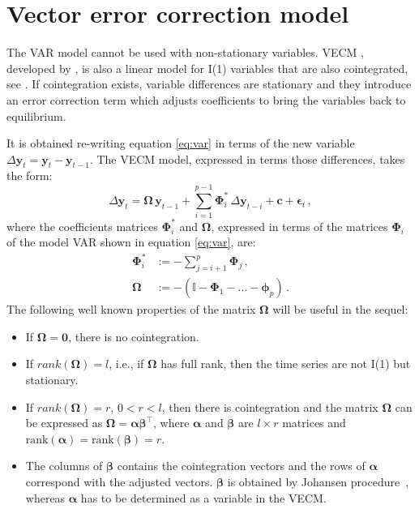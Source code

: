\section{Vector error correction model}\label{sec:vecm}
The VAR model cannot be used with non-stationary variables. VECM ,
developed by \cite{engle87}, is also a linear model for I(1) variables that are
also cointegrated, see \cite{banerjee1993}. If cointegration exists, variable
differences are stationary and they introduce an error correction term which
adjusts coefficients to bring the variables back to equilibrium. 

It is obtained re-writing equation \ref{eq:var} in terms of the new
variable $\Delta\mathbf{y}_t=\mathbf{y}_t-\mathbf{y}_{t-1}$.
The VECM model, expressed in terms those differences, takes the form:
\begin{equation}\label{eq:vec}
\Delta \mathbf{y}_t 
= \boldsymbol{\Omega}\,\mathbf{y}_{t-1}
  + \sum_{i=1}^{p-1} \boldsymbol{\Phi}_i^*\,\Delta\mathbf{y}_{t-i}
  + \mathbf{c} + \boldsymbol{\epsilon}_t\,,
\end{equation}
\noindent
where the coefficients matrices $\boldsymbol{\Phi}_i^*$ and 
$\boldsymbol{\Omega}$, expressed in terms of the matrices
$\boldsymbol{\Phi}_i$ of the model VAR shown in equation \ref{eq:var}, are:
\begin{align*}
\boldsymbol{\Phi}_i^* 
&:= -\sum_{j=i+1}^{p}\boldsymbol{\Phi}_j\,, \\
\boldsymbol{\Omega}
&:= -\left( \mathbb{I} - \boldsymbol{\Phi}_1 - \dots 
    - \boldsymbol{\phi}_p \right)\,. 
\end{align*}
The following well known properties of the matrix $\boldsymbol{\Omega}$
\cite{johansen1995} will be useful in the sequel:
\begin{itemize}
\item
If $\boldsymbol{\Omega} = \mathbf{0}$, there is no cointegration.
\item 
If $rank(\boldsymbol{\Omega})=l$, i.e., if $\boldsymbol{\Omega}$ has
full rank, then the time series are not I(1) but stationary.
\item
If $rank(\boldsymbol{\Omega})=r$, $0<r<l$, then there is cointegration
and the matrix $\boldsymbol{\Omega}$ can be expressed as
$\boldsymbol{\Omega}=\boldsymbol{\alpha\beta}^\top$, where $\boldsymbol{\alpha}$
and $\boldsymbol{\beta}$ are
$l\times r$ matrices and
$\text{rank}(\boldsymbol{\alpha})=\text{rank}(\boldsymbol{\beta})=r$.
\item
The columns of $\boldsymbol{\beta}$ contains the cointegration vectors and the rows of
$\boldsymbol{\alpha}$ correspond with the adjusted vectors. 
$\boldsymbol{\beta}$ is obtained by Johansen procedure~\cite{johansen1988},
whereas $\boldsymbol{\alpha}$ has to be determined as a variable in the VECM.
\end{itemize}
